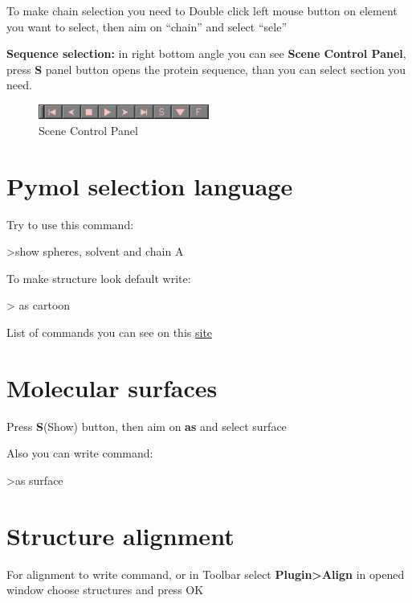 \documentclass{article}
\begin{document}
To make chain selection you need to Double click left mouse button on element you want to select, then aim on ``chain'' and select ``sele''

\textbf{Sequence selection:} in right bottom angle you can see \textbf{Scene Control Panel}, press {\color{pink} {\Large \textbf{S}}} panel button opens the protein sequence, than you can select section you need.

\begin{figure}[h!]
    \centering
    \includegraphics[width=0.5\textwidth]{workshops/pymol/imgs/panel.png}
    \caption[]{Scene Control Panel}
    \label{panel}
\end{figure}







\section{Pymol selection language}

Try to use this command:

>show spheres, solvent and chain A

To make structure look default write:

> as cartoon

List of commands you can see on this \href{https://pymolwiki.org/index.php/Selection_Algebra}{site}








\section{Molecular surfaces}

Press {\Large \textbf{S}}(Show) button, then aim on \textbf{as} and select surface

Also you can write command: 

>as surface







\section{Structure alignment}

For alignment to write command, or in Toolbar select \textbf{Plugin>Align} in opened window choose structures and press OK
\end{document}
